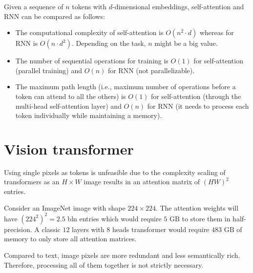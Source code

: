 \begin{remark}
    Given a sequence of $n$ tokens with $d$-dimensional embeddings, self-attention and RNN can be compared as follows:
    \begin{itemize}
        \item The computational complexity of self-attention is $O(n^2 \cdot d)$ whereas for RNN is $O(n \cdot d^2)$. Depending on the task, $n$ might be a big value.
        \item The number of sequential operations for training is $O(1)$ for self-attention (parallel training) and $O(n)$ for RNN (not parallelizable).
        \item The maximum path length (i.e., maximum number of operations before a token can attend to all the others) is $O(1)$ for self-attention (through the multi-head self-attention layer) and $O(n)$ for RNN (it needs to process each token individually while maintaining a memory).
    \end{itemize}
\end{remark}



\section{Vision transformer}

\begin{remark}
    Using single pixels as tokens is unfeasible due to the complexity scaling of transformers as an $H \times W$ image results in an attention matrix of $(HW)^2$ entries.

    \indenttbox
    \begin{example}
        Consider an ImageNet image with shape $224 \times 224$. The attention weights will have $(224^2)^2 = 2.5 \text{ bln}$ entries which would require $5 \text{ GB}$ to store them in half-precision. A classic $12$ layers with $8$ heads transformer would require $483 \text{ GB}$ of memory to only store all attention matrices.
    \end{example}
\end{remark}

\begin{remark}
    Compared to text, image pixels are more redundant and less semantically rich. Therefore, processing all of them together is not strictly necessary.
\end{remark}

